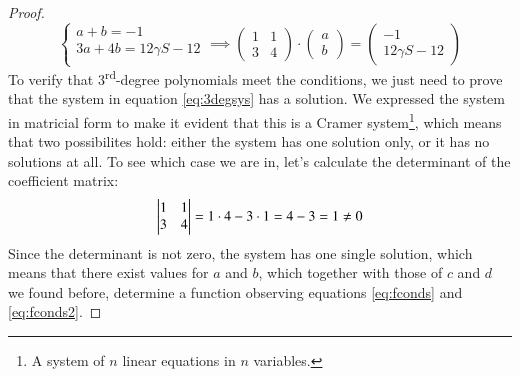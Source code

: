\begin{proposition}
\begin{proof}
\begin{equation}
\begin{cases}
a+b=-1\\
3a + 4b = 12 \gamma S - 12 \\
\end{cases}
\implies
\begin{pmatrix}
1 & 1 \\
3 & 4
\end{pmatrix}
\cdot
\begin{pmatrix}
a \\
b
\end{pmatrix}
=
\begin{pmatrix}
-1 \\
12 \gamma S - 12
\end{pmatrix}
\end{equation}
To verify that 3\textsuperscript{rd}-degree polynomials meet the conditions, we
just need to prove that the system in equation \ref{eq:3degsys} has a solution.
We expressed the system in matricial form to make it evident that this is a 
Cramer system\footnote{A system of $n$ linear equations in $n$ variables.},
which means that two possibilites hold: either the system has one solution only, or 
it has no solutions at all. To see which case we are in, let's calculate the determinant
of the coefficient matrix:
\begin{equation*}
\left|
\begin{matrix}
1 & 1 \\
3 & 4
\end{matrix}
\right|
= 1 \cdot 4 - 3 \cdot 1 = 4 - 3 = 1 \not\eq 0
\end{equation*}
Since the determinant is not zero, the system has one single solution, which means
that there exist values for $a$ and $b$, which together with those of $c$ and $d$ we
found before, determine a function observing equations 
\ref{eq:fconds} and \ref{eq:fconds2}.


\end{proof}
\end{proposition}
